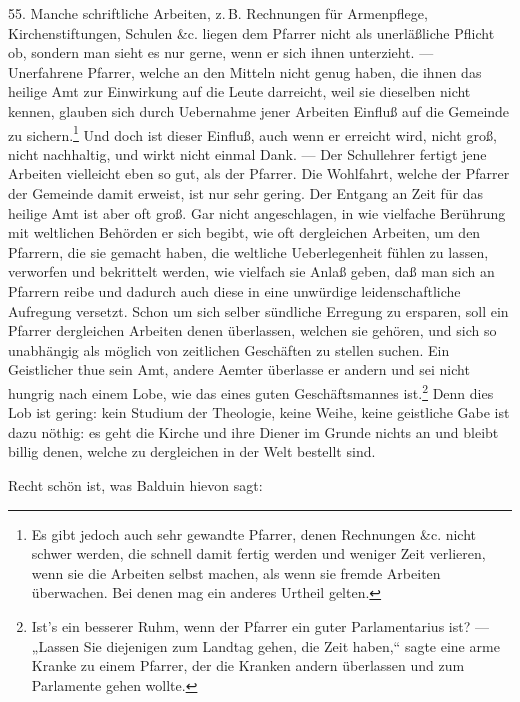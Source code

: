 55. Manche schriftliche Arbeiten, z.\,B. Rechnungen für Armenpflege, Kirchenstiftungen, Schulen \&c. liegen dem
Pfarrer nicht als unerläßliche Pflicht ob, sondern man sieht es nur gerne, wenn er sich ihnen unterzieht. — Unerfahrene Pfarrer, welche an den Mitteln nicht genug haben, die ihnen das heilige Amt zur Einwirkung auf die Leute darreicht, weil sie dieselben nicht kennen, glauben sich durch Uebernahme jener Arbeiten Einfluß auf die Gemeinde zu sichern.\footnote{Es gibt jedoch auch sehr gewandte Pfarrer, denen Rechnungen \&c. nicht schwer werden, die schnell damit fertig werden und weniger Zeit verlieren, wenn sie die Arbeiten selbst machen, als wenn sie fremde Arbeiten überwachen. Bei denen mag ein anderes Urtheil gelten.} Und doch ist dieser Einfluß, auch wenn er erreicht wird, nicht groß, nicht nachhaltig, und wirkt nicht einmal Dank. — Der Schullehrer fertigt jene Arbeiten vielleicht eben so gut, als der Pfarrer. Die Wohlfahrt, welche der Pfarrer der Gemeinde damit erweist, ist nur sehr gering. Der Entgang an Zeit für das heilige Amt ist aber oft groß. Gar nicht angeschlagen, in wie vielfache Berührung mit weltlichen Behörden er sich begibt, wie oft dergleichen Arbeiten, um den Pfarrern, die sie gemacht haben, die weltliche Ueberlegenheit fühlen zu lassen, verworfen und bekrittelt werden, wie vielfach sie Anlaß geben, daß man sich an Pfarrern reibe und dadurch auch diese in eine unwürdige leidenschaftliche Aufregung versetzt. Schon um sich selber sündliche Erregung zu ersparen, soll ein Pfarrer dergleichen Arbeiten denen überlassen, welchen sie gehören, und sich so unabhängig als möglich von zeitlichen Geschäften zu stellen suchen. Ein Geistlicher thue sein Amt, andere Aemter überlasse er andern und sei nicht hungrig
nach einem Lobe, wie das eines guten Geschäftsmannes ist.\footnote{Ist’s ein besserer Ruhm, wenn der Pfarrer ein guter Parlamentarius ist? — „Lassen Sie diejenigen zum Landtag gehen, die Zeit haben,“ sagte eine arme Kranke zu einem Pfarrer, der die Kranken andern überlassen und zum Parlamente gehen wollte.} Denn dies Lob ist gering: kein Studium der Theologie, keine Weihe, keine geistliche Gabe ist dazu nöthig: es geht die Kirche und ihre Diener im Grunde nichts an und bleibt billig denen, welche zu dergleichen in der Welt bestellt sind.

Recht schön ist, was Balduin hievon sagt:

